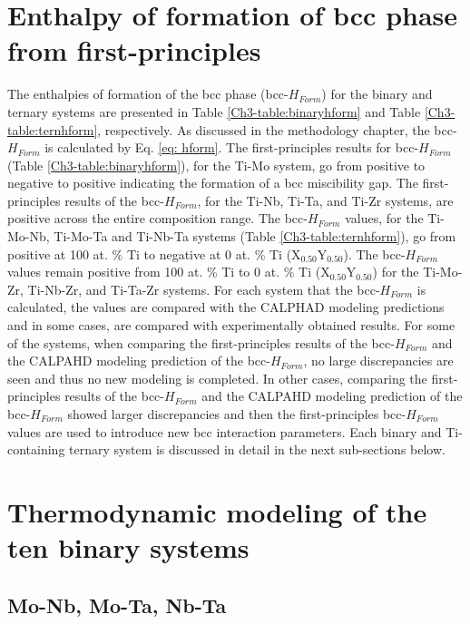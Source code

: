 \section{Enthalpy of formation of bcc phase from first-principles}

The enthalpies of formation of the bcc phase (bcc-$H_{Form}$) for the binary and ternary systems are presented in Table \ref{Ch3-table:binaryhform} and Table \ref{Ch3-table:ternhform}, respectively. As discussed in the methodology chapter, the bcc-$H_{Form}$ is calculated by Eq. \ref{eq: hform}. The first-principles results for bcc-$H_{Form}$ (Table \ref{Ch3-table:binaryhform}), for the Ti-Mo system, go from positive to negative to positive indicating the formation of a bcc miscibility gap. The first-principles results of the bcc-$H_{Form}$, for the Ti-Nb, Ti-Ta, and Ti-Zr systems, are positive across the entire composition range. The bcc-$H_{Form}$ values, for the Ti-Mo-Nb, Ti-Mo-Ta and Ti-Nb-Ta systems (Table \ref{Ch3-table:ternhform}), go from positive at 100 at. \% Ti to negative at 0 at. \% Ti (X$_{0.50}$Y$_{0.50}$). The bcc-$H_{Form}$ values remain positive from 100 at. \% Ti to 0 at. \% Ti (X$_{0.50}$Y$_{0.50}$) for the Ti-Mo-Zr, Ti-Nb-Zr, and Ti-Ta-Zr systems. For each system that the bcc-$H_{Form}$ is calculated, the values are compared with the CALPHAD modeling predictions and in some cases, are compared with experimentally obtained results. For some of the systems, when comparing the first-principles results of the bcc-$H_{Form}$ and the CALPAHD modeling prediction of the bcc-$H_{Form}$, no large discrepancies are seen and thus no new modeling is completed. In other cases, comparing the first-principles results of the bcc-$H_{Form}$ and the CALPAHD modeling prediction of the bcc-$H_{Form}$ showed larger discrepancies and then the first-principles bcc-$H_{Form}$ values are used to introduce new bcc interaction parameters. Each binary and Ti-containing ternary system is discussed in detail in the next sub-sections below.

\section{Thermodynamic modeling of the ten binary systems}

\subsection{Mo-Nb, Mo-Ta, Nb-Ta}

